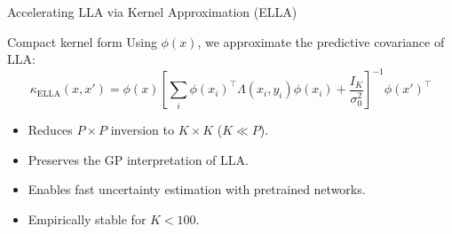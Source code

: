 \documentclass{beamer}
\begin{document}
\begin{frame}{Accelerating LLA via Kernel Approximation (ELLA)}







\begin{block}{Compact kernel form}
Using $\phi(x)$, we approximate the predictive covariance of LLA:
\[
\kappa_{\text{ELLA}}(x, x') = 
\phi(x)
\left[
\sum_i \phi(x_i)^\top \Lambda(x_i, y_i)\phi(x_i)
+ \frac{I_K}{\sigma_0^2}
\right]^{-1}
\phi(x')^\top
\]
\end{block}

\begin{itemize}
    \item Reduces $P\times P$ inversion to $K\times K$ (\(K \ll P\)).
    \item Preserves the GP interpretation of LLA.
    \item Enables fast uncertainty estimation with pretrained networks.
    \item Empirically stable for $K<100$.
\end{itemize}

\end{frame}
\end{document}
